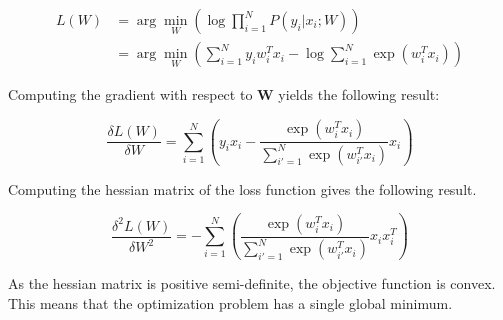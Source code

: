 \documentclass[12pt]{article}
\begin{document}
\begin{enumerate}[leftmargin=\labelsep]
\begin{enumerate}[label=\alph*)]
                    \begin{equation}
                        \begin{aligned}
                            L(W) & = \arg\min_{W} \left(\log \prod_{i=1}^N P(y_i | x_i; W) \right)                               \\
                                 & = \arg\min_{W} \left( \sum_{i=1}^N y_i w_i^T x_i - \log \sum_{i=1}^N \exp (w_i^T x_i) \right)
                        \end{aligned}
                    \end{equation}

                    \vspace{12pt}

                    Computing the gradient with respect to \textbf{W} yields the following result:

                    \begin{equation}
                        \frac{\delta L(W)}{\delta W} = \sum_{i=1}^N \left( y_i x_i - \frac{\exp (w_i^T x_i)}{\sum\limits_{i'=1}^N \exp (w_{i'}^T x_i)} x_i \right)
                    \end{equation}

                    \vspace{12pt}

                    Computing the hessian matrix of the loss function gives the following result.

                    \vspace{12pt}

                    \begin{equation}
                        \frac{\delta^2 L(W)}{\delta W^2} = - \sum_{i=1}^N \left( \frac{\exp (w_i^T x_i)}{\sum\limits_{i'=1}^N \exp (w_{i'}^T x_i)} x_i x_i^T \right)
                    \end{equation}

                    \vspace{12pt}

                    As the hessian matrix is positive semi-definite, the objective function is convex. This means that the optimization problem has a single global minimum.

                    \vspace{12pt}


\end{enumerate}
\end{enumerate}
\end{document}
